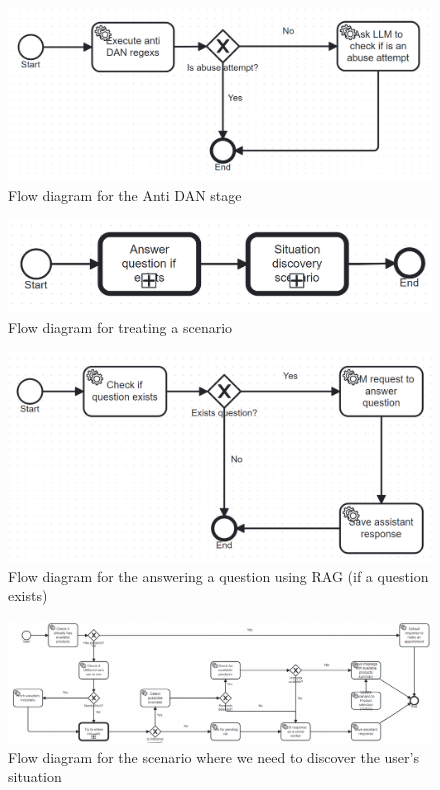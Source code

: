 \documentclass[a4paper,12pt,twoside]{ThesisStyle}
\begin{document}
\begin{figure}[H]
  \centering
  \includegraphics[width=1\textwidth]{imatges/Execute_anti_DAN.bpmn20.png}
  \caption{Flow diagram for the Anti DAN stage}
  \label{fig:antidan}
\end{figure}

\begin{figure}[H]
  \centering
  \includegraphics[width=1\textwidth]{imatges/Treat_conversation_scenario.bpmn20.png}
  \caption{Flow diagram for treating a scenario}
  \label{fig:treatscenario}
\end{figure}

\begin{figure}[H]
  \centering
  \includegraphics[width=1\textwidth]{imatges/Answer_question_if_exists.bpmn20.png}
  \caption{Flow diagram for the answering a question using RAG (if a question exists)}
  \label{fig:answerragquestionifexists}
\end{figure}

\begin{figure}[H]
  \centering
  \includegraphics[width=1\textwidth]{imatges/Situation_discovery_scenario.bpmn20.png}
  \caption{Flow diagram for the scenario where we need to discover the user's situation}
  \label{fig:executesituationdiscoveryscenario}
\end{figure}
\end{document}
